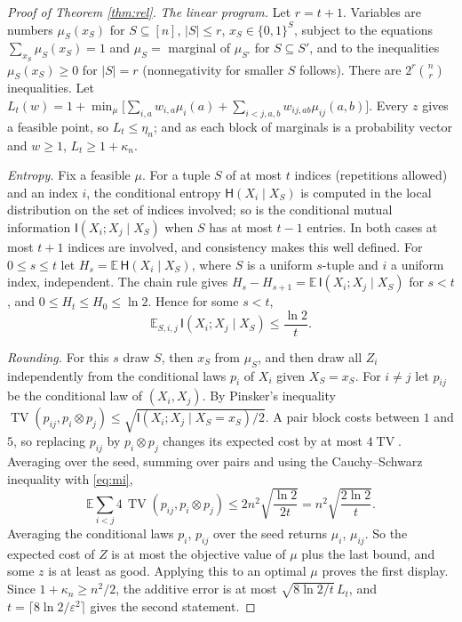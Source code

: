 \documentclass[11pt]{amsart}
\theoremstyle{plain}
\theoremstyle{definition}
\theoremstyle{remark}
\newcommand{\E}{\mathbb{E}}
\newcommand{\Ent}{\mathsf{H}}
\newcommand{\MI}{\mathsf{I}}
\newcommand{\TV}{\operatorname{TV}}
\begin{document}
\begin{proof}[Proof of Theorem \ref{thm:rel}]
\emph{The linear program.} Let $r=t+1$. Variables are numbers $\mu_S(x_S)$ for $S\subseteq[n]$, $|S|\le r$,
$x_S\in\{0,1\}^S$, subject to the equations $\sum_{x_S}\mu_S(x_S)=1$ and $\mu_S=$ marginal of $\mu_{S'}$ for
$S\subseteq S'$, and to the inequalities $\mu_S(x_S)\ge0$ for $|S|=r$ (nonnegativity for smaller $S$ follows). There
are $2^r\binom nr$ inequalities. Let $L_t(w)=1+\min_\mu\bigl[\sum_{i,a}w_{i,a}\mu_i(a)+\sum_{i<j,a,b}w_{ij,ab}\mu_{ij}(a,b)\bigr]$.
Every $z$ gives a feasible point, so $L_t\le\eta_n$; and as each block of marginals is a probability vector and
$w\ge1$, $L_t\ge1+\kappa_n$.

\emph{Entropy.} Fix a feasible $\mu$. For a tuple $S$ of at most $t$ indices (repetitions allowed) and an index $i$,
the conditional entropy $\Ent(X_i\mid X_S)$ is computed in the local distribution on the set of indices involved; so
is the conditional mutual information $\MI(X_i;X_j\mid X_S)$ when $S$ has at most $t-1$ entries. In both cases at
most $t+1$ indices are involved, and consistency makes this well defined. For $0\le s\le t$ let $H_s=\E\,\Ent(X_i\mid X_{S})$, where $S$ is a uniform $s$-tuple and $i$ a uniform
index, independent. The chain rule gives $H_s-H_{s+1}=\E\,\MI(X_i;X_j\mid X_S)$ for $s<t$, and
$0\le H_t\le H_0\le\ln2$. Hence for some $s<t$,
\begin{equation}\label{eq:mi}
 \E_{S,i,j}\,\MI(X_i;X_j\mid X_S)\le\frac{\ln2}{t}.
\end{equation}

\emph{Rounding.} For this $s$ draw $S$, then $x_S$ from $\mu_S$, and then draw all $Z_i$ independently from the
conditional laws $p_i$ of $X_i$ given $X_S=x_S$. For $i\ne j$ let $p_{ij}$ be the conditional law of $(X_i,X_j)$. By
Pinsker's inequality $\TV(p_{ij},p_i\otimes p_j)\le\sqrt{\MI(X_i;X_j\mid X_S=x_S)/2}$. A pair block costs between
$1$ and $5$, so replacing $p_{ij}$ by $p_i\otimes p_j$ changes its expected cost by at most $4\TV$. Averaging over
the seed, summing over pairs and using the Cauchy--Schwarz inequality with \eqref{eq:mi},
\[
 \E\sum_{i<j}4\,\TV(p_{ij},p_i\otimes p_j)\le2n^2\sqrt{\frac{\ln2}{2t}}=n^2\sqrt{\frac{2\ln2}{t}} .
\]
Averaging the conditional laws $p_i$, $p_{ij}$ over the seed returns $\mu_i$, $\mu_{ij}$. So the expected cost of
$Z$ is at most the objective value of $\mu$ plus the last bound, and some $z$ is at least as good. Applying this to
an optimal $\mu$ proves the first display. Since $1+\kappa_n\ge n^2/2$, the additive error is at most
$\sqrt{8\ln2/t}\,L_t$, and $t=\lceil8\ln2/\varepsilon^2\rceil$ gives the second statement.
\end{proof}
\end{document}
